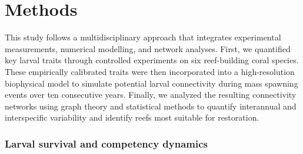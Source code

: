 \documentclass[preprint,12pt,authoryear]{elsarticle}
\begin{document}
	
	\section*{Methods}
	
	This study follows a multidisciplinary approach that integrates experimental measurements, numerical modelling, and network analyses. First, we quantified key larval traits through controlled experiments on six reef-building coral species. These empirically calibrated traits were then incorporated into a high-resolution biophysical model to simulate potential larval connectivity during mass spawning events over ten consecutive years. Finally, we analyzed the resulting connectivity networks using graph theory and statistical methods to quantify interannual and interspecific variability and identify reefs most suitable for restoration.
	
	\subsubsection*{Larval survival and competency dynamics}
	
\end{document}
